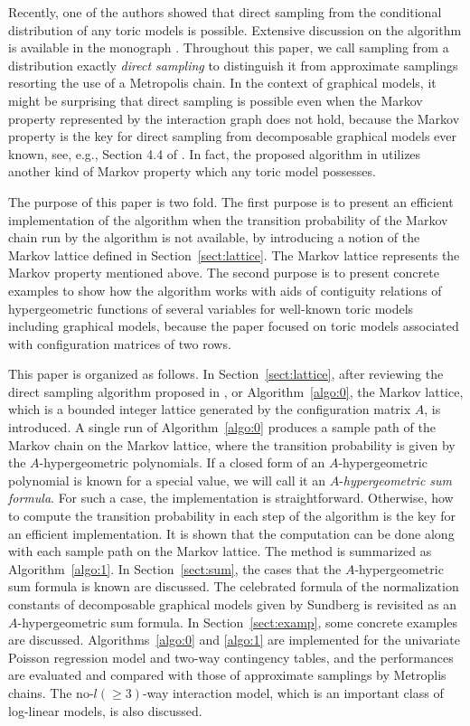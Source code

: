 \documentclass[a4paper,12pt]{article}
\theoremstyle{plain}
\theoremstyle{remark}
\begin{document}
Recently, one of the authors \cite{Man17} showed that direct
sampling from the conditional distribution of any toric models
is possible. Extensive discussion on the algorithm is
available in the monograph \cite{Man18}.
Throughout this paper, we call sampling from a distribution
exactly {\it direct sampling} to distinguish it from
approximate samplings resorting the use of a Metropolis
chain. In the context of graphical models, it might be
surprising that direct sampling is possible even when
the Markov property represented by the interaction graph
does not hold, because the Markov property is the key for
direct sampling from decomposable graphical models ever known,
see, e.g., Section 4.4 of \cite{Lau94}. In fact, the proposed
algorithm in \cite{Man17} utilizes another kind of Markov
property which any toric model possesses.

The purpose of this paper is two fold. The first purpose is
to present an efficient implementation of the algorithm when
the transition probability of the Markov chain run by
the algorithm is not available, by introducing a notion of
the Markov lattice defined in Section~\ref{sect:lattice}.
The Markov lattice represents the Markov property mentioned
above. The second purpose is to present concrete examples
to show how the algorithm works with aids of 
contiguity relations of hypergeometric functions of several
variables for well-known toric models including graphical
models, because the paper \cite{Man17} focused on toric models
associated with configuration matrices of two rows.

This paper is organized as follows. In Section~\ref{sect:lattice},
after reviewing the direct sampling algorithm proposed in
\cite{Man17}, or Algorithm~\ref{algo:0}, the Markov lattice,
which is a bounded integer lattice generated by the configuration
matrix $A$, is introduced. A single run of Algorithm~\ref{algo:0}
produces a sample path of the Markov chain on the Markov lattice,
where the transition probability is given by the
$A$-hypergeometric polynomials. If a closed form of an
$A$-hypergeometric polynomial is known for a special value,
we will call it an $A$-{\it hypergeometric sum formula}.
For such a case, the implementation is straightforward.
Otherwise, how to compute the transition probability in each
step of the algorithm is the key for an efficient implementation.
It is shown that the computation can be done along with each
sample path on the Markov lattice. The method is summarized as
Algorithm~\ref{algo:1}. In Section~\ref{sect:sum}, the cases
that the $A$-hypergeometric sum formula is known are discussed.
The celebrated formula of the normalization constants of
decomposable graphical models given by Sundberg \cite{Sun75} is revisited as
an $A$-hypergeometric sum formula. In Section~\ref{sect:examp},
some concrete examples are discussed. Algorithms~\ref{algo:0}
and \ref{algo:1} are implemented for the univariate Poisson
regression model and two-way contingency tables, and
the performances are evaluated and compared with those of
approximate samplings by Metroplis chains. The no-$l(\ge 3)$-way
interaction model, which is an important
class of log-linear models, is also discussed.
\end{document}
